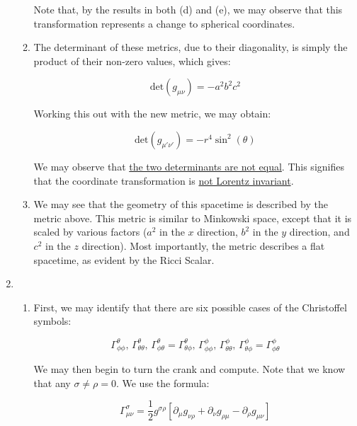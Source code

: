 \begin{enumerate}
\begin{enumerate}
          Note that, by the results in both (d) and (e), we may observe that this transformation represents a change to spherical coordinates.

      \item 

        The determinant of these metrics, due to their diagonality, is simply the product of their non-zero values, which gives:

        $$\boxed{\text{det}(g_{\mu\nu})=-a^2b^2c^2}$$

        Working this out with the new metric, we may obtain:

        $$\boxed{\text{det}(g_{\mu'\nu'})=-r^4\sin^2(\theta)}$$

        We may observe that \underline{the two determinants are not equal}. This signifies that the coordinate transformation is \underline{not Lorentz invariant}.

      \item 

        We may see that the geometry of this spacetime is described by the metric above. This metric is similar to Minkowski space, except that it is scaled by various factors ($a^2$ in the $x$ direction, $b^2$ in the $y$ direction, and $c^2$ in the $z$ direction). Most importantly, the metric describes a flat spacetime, as evident by the Ricci Scalar.

    \end{enumerate}

  \item

    \begin{enumerate}

      \item 

        First, we may identify that there are six possible cases of the Christoffel symbols:

        $$\Gamma^{\theta}_{\phi\phi},\,\Gamma^{\theta}_{\theta\theta},\,\Gamma^{\theta}_{\phi\theta}=\Gamma^{\theta}_{\theta\phi},\,\Gamma^{\phi}_{\phi\phi},\,\Gamma^{\phi}_{\theta\theta},\,\Gamma^{\phi}_{\theta\phi}=\Gamma^{\phi}_{\phi\theta}$$

        We may then begin to turn the crank and compute. Note that we know that any $\sigma\neq\rho=0$. We use the formula:

        $$\Gamma^{\sigma}_{\mu\nu}=\frac{1}{2}g^{\sigma\rho}\left[ \partial_{\mu}g_{\nu\rho}+\partial_{\nu}g_{\rho\mu}-\partial_{\rho}g_{\mu\nu} \right]$$


\end{enumerate}
\end{enumerate}
